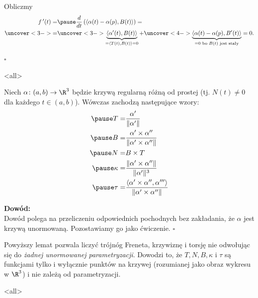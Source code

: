 \begin{frame}
Obliczmy 
\[\begin{split}
f\,'(t)=&\pause\frac{d}{dt}\left(\langle\alpha(t)-\alpha(p),B(t)\rangle\right)=\\
\uncover<3->{=}&\uncover<3->{\underbrace{\langle\alpha'(t),B(t)\rangle}_{=\langle T(t),B(t)\rangle=0}+}
\uncover<4->{\underbrace{\langle\alpha(t)-\alpha(p),B'(t) \rangle}_{=0\text{ bo $B(t)$ jest stały}}=0.}
\end{split}\]

\hfill $\square$
\end{frame}
\mode<all>{}
\begin{frame}
\begin{lemat}\label{lem_curv:wzory-ogolne}
Niech $\alpha\colon (a,b)\to \R^3$ będzie krzywą regularną r\'ożną od prostej (tj. $N(t)\neq 0$ dla każdego $t\in (a,b)$). Wówczas zachodzą następujące wzory:
\begin{align}
\pause T=& \frac{\alpha'}{\|\alpha'\|}\label{eqn:T}\\
\pause B=& \frac{\alpha'\times \alpha''}{\|\alpha'\times \alpha''\|}\label{eqn:B}\\
\pause N=& B\times T\label{eqn:N}\\
\pause \kappa=&\frac{\|\alpha'\times \alpha''\|}{\|\alpha'\|^3}\label{eqn:k}\\
\pause \tau=&\frac{\langle \alpha'\times \alpha'',\alpha'''\rangle}{\|\alpha'\times \alpha''\|}\label{eqn:t}
\end{align}

\end{lemat}
\end{frame}
\begin{frame}[<+->]

\textcolor{ared}{\textbf{Dowód:}}\pause \\
Dowód  polega na przeliczeniu odpowiednich pochodnych bez zakładania, że $\alpha$ jest krzywą unormowaną. Pozostawiamy go jako ćwiczenie.
\hfill $\square$

\pause\begin{uwaga}
Powyższy lemat pozwala liczyć trójnóg Freneta, krzywiznę i torsję nie odwołując się do \textit{żadnej unormowanej parametryzacji}. Dowodzi to, że $T,N,B,\kappa$ i $\tau$ są funkcjami tylko i wyłącznie punktów na krzywej (rozumianej jako obraz wykresu w $\R^3$) i nie zależą od parametryzacji.
\end{uwaga}

\end{frame}
\mode<all> 
